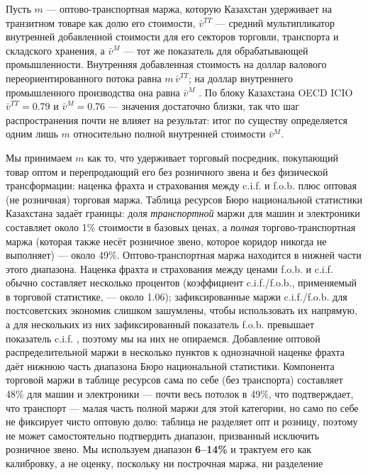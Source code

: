 \documentclass[12pt]{article}
\begin{document}
Пусть $m$ — оптово-транспортная маржа, которую Казахстан удерживает на транзитном товаре как
долю его стоимости, $\bar v^{TT}$ — средний мультипликатор внутренней добавленной стоимости
для его секторов торговли, транспорта и складского хранения, а $\bar v^{M}$ — тот же
показатель для обрабатывающей промышленности. Внутренняя добавленная стоимость на доллар
валового переориентированного потока равна $m\,\bar v^{TT}$; на доллар внутреннего
промышленного производства она равна $\bar v^{M}$
\citep{koopman2014tracing,johnson2012accounting}. По блоку Казахстана OECD ICIO
$\bar v^{TT} = 0.79$ и $\bar v^{M} = 0.76$ — значения достаточно близки, так что шаг
распространения почти не влияет на результат: итог по существу определяется одним лишь $m$
относительно полной внутренней стоимости $\bar v^{M}$.

Мы принимаем $m$ как то, что удерживает торговый посредник, покупающий товар оптом и
перепродающий его без розничного звена и без физической трансформации: наценка фрахта и
страхования между c.i.f. и f.o.b. плюс оптовая (не розничная) торговая маржа. Таблица
ресурсов Бюро национальной статистики Казахстана \citep{qazstat2023io} задаёт границы: доля
\emph{транспортной} маржи для машин и электроники составляет около 1\% стоимости в базовых
ценах, а \emph{полная} торгово-транспортная маржа (которая также несёт розничное звено,
которое коридор никогда не выполняет) — около 49\%. Оптово-транспортная маржа находится в
нижней части этого диапазона. Наценка фрахта и страхования между ценами f.o.b. и c.i.f.
обычно составляет несколько процентов (коэффициент c.i.f./f.o.b., применяемый в торговой
статистике, — около 1.06); зафиксированные маржи c.i.f./f.o.b. для постсоветских экономик
слишком зашумлены, чтобы использовать их напрямую, а для нескольких из них зафиксированный
показатель f.o.b. превышает показатель c.i.f. \citep{arvis2010landlocked}, поэтому мы на них
не опираемся. Добавление оптовой распределительной маржи в несколько пунктов к
однозначной наценке фрахта даёт нижнюю часть диапазона Бюро национальной статистики.
Компонента торговой маржи в таблице ресурсов сама по себе (без транспорта) составляет 48\%
для машин и электроники — почти весь потолок в 49\%, что подтверждает, что транспорт —
малая часть полной маржи для этой категории, но само по себе не фиксирует чисто оптовую
долю: таблица не разделяет опт и розницу, поэтому не может самостоятельно подтвердить
диапазон, призванный исключить розничное звено. Мы используем диапазон \textbf{6--14\%} и
трактуем его как калибровку, а не оценку, поскольку ни построчная маржа, ни разделение
\end{document}
